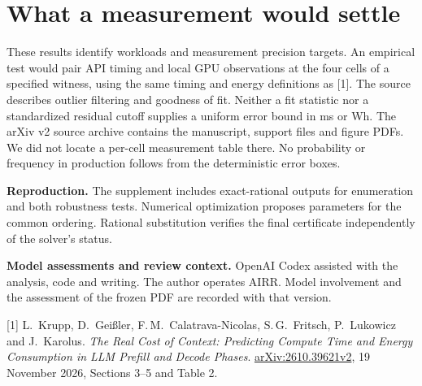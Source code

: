 \documentclass[11pt]{article}
\begin{document}
\section*{What a measurement would settle}
These results identify workloads and measurement precision targets. An empirical test would pair API timing and local GPU observations at the four cells of a specified witness, using the same timing and energy definitions as [1]. The source describes outlier filtering and goodness of fit. Neither a fit statistic nor a standardized residual cutoff supplies a uniform error bound in ms or Wh. The arXiv v2 source archive contains the manuscript, support files and figure PDFs. We did not locate a per-cell measurement table there. No probability or frequency in production follows from the deterministic error boxes.

\textbf{Reproduction.} The supplement includes exact-rational outputs for enumeration and both robustness tests. Numerical optimization proposes parameters for the common ordering. Rational substitution verifies the final certificate independently of the solver's status.

\textbf{Model assessments and review context.} OpenAI Codex assisted with the analysis, code and writing. The author operates AIRR. Model involvement and the assessment of the frozen PDF are recorded with that version.

\small [1] L.\ Krupp, D.\ Gei{\ss}ler, F.\,M.\ Calatrava-Nicolas, S.\,G.\ Fritsch, P.\ Lukowicz and J.\ Karolus. \emph{The Real Cost of Context: Predicting Compute Time and Energy Consumption in LLM Prefill and Decode Phases}. \href{https://arxiv.org/abs/2610.39621v2}{arXiv:2610.39621v2}, 19 November 2026, Sections 3--5 and Table 2.
\end{document}

